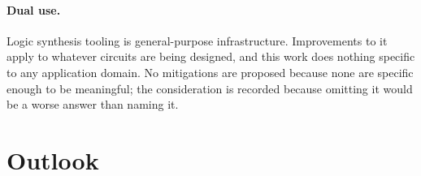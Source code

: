 \paragraph{Dual use.}
Logic synthesis tooling is general-purpose infrastructure. Improvements to it apply to
whatever circuits are being designed, and this work does nothing specific to any application
domain. No mitigations are proposed because none are specific enough to be meaningful; the
consideration is recorded because omitting it would be a worse answer than naming it.


\section{Outlook}
\label{sec:discussion:outlook}

